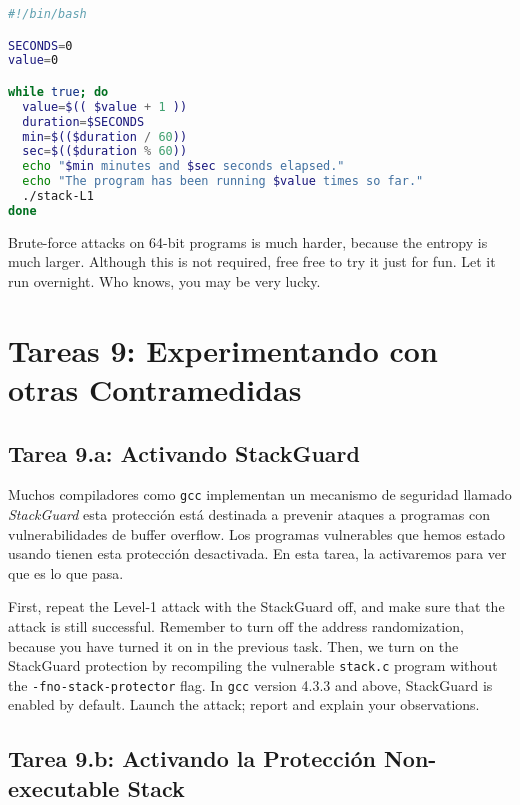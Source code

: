 \begin{lstlisting}[language=bash]
#!/bin/bash

SECONDS=0
value=0

while true; do
  value=$(( $value + 1 ))
  duration=$SECONDS
  min=$(($duration / 60))
  sec=$(($duration % 60))
  echo "$min minutes and $sec seconds elapsed."
  echo "The program has been running $value times so far."
  ./stack-L1
done
\end{lstlisting}


Brute-force attacks on 64-bit programs is much harder, because the entropy
is much larger. Although this is not required, free free to try it just for fun. 
Let it run overnight. Who knows, you may be very lucky. 


\section{Tareas 9: Experimentando con otras Contramedidas}


\subsection{Tarea 9.a: Activando StackGuard}

Muchos compiladores como \texttt{gcc} implementan un mecanismo de seguridad llamado \textit{StackGuard} esta protección está destinada a prevenir ataques a programas con vulnerabilidades de buffer overflow. Los programas vulnerables que hemos estado usando tienen esta protección desactivada. 
En esta tarea, la activaremos para ver que es lo que pasa.

First, repeat the Level-1 attack with the StackGuard off, and make sure that the
attack is still successful. Remember to turn off the address randomization, because
you have turned it on in the previous task.
Then, we turn on the StackGuard protection by
recompiling the vulnerable \texttt{stack.c} program without the
\texttt{-fno-stack-protector} flag.
In \texttt{gcc} version 4.3.3 and above, StackGuard is enabled by
default. Launch the attack; report and explain your observations.



\subsection{Tarea 9.b: Activando la Protección Non-executable Stack}

